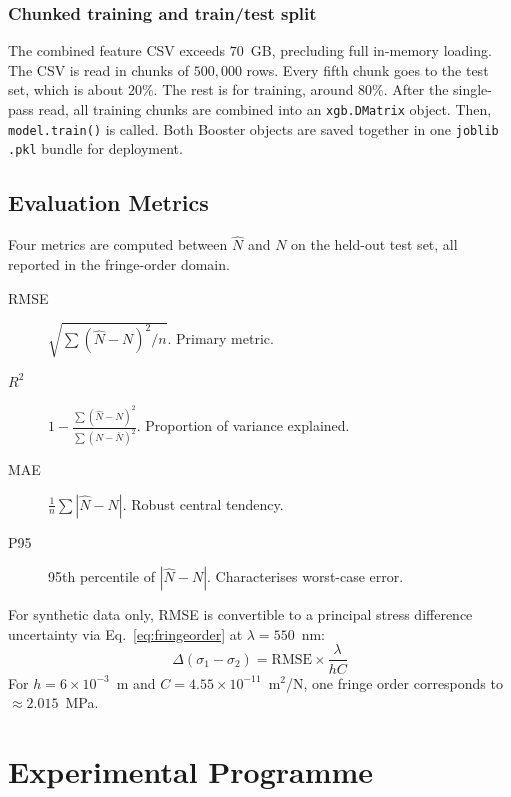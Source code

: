 \documentclass[review,12pt]{elsarticle}
\begin{document}
\subsubsection{Chunked training and train/test split}

The combined feature CSV exceeds $70$~GB, precluding full in-memory loading. The CSV is read in chunks of $500{,}000$ rows. Every fifth chunk goes to the test set, which is about $20\%$. The rest is for training, around $80\%$. After the single-pass read, all training chunks are combined into an \texttt{xgb.DMatrix} object. Then, \texttt{model.train()} is called. Both Booster objects are saved together in one \texttt{joblib} \texttt{.pkl} bundle for deployment.

\subsection{Evaluation Metrics}
\label{sec:metrics}

Four metrics are computed between $\hat{N}$ and $N$ on the held-out test
set, all reported in the fringe-order domain.

\begin{description}
  \item[RMSE] $\sqrt{\sum(\hat{N}-N)^2 / n}$. Primary metric.
  \item[$R^2$] $1 - \frac{\sum(\hat{N}-N)^2}{\sum(N-\bar{N})^2}$.
    Proportion of variance explained.
  \item[MAE] $\frac{1}{n}\sum|\hat{N}-N|$. Robust central tendency.
  \item[P95] 95th percentile of $|\hat{N}-N|$. Characterises worst-case
    error.
\end{description}

For synthetic data only, RMSE is convertible to a principal stress
difference uncertainty via Eq.~\eqref{eq:fringeorder} at
$\lambda = 550$~nm:
\begin{equation}
  \Delta(\sigma_1-\sigma_2) = \mathrm{RMSE} \times \frac{\lambda}{hC}
  \label{eq:stress_uncertainty}
\end{equation}
For $h = 6\times10^{-3}$~m and $C = 4.55\times10^{-11}$~m$^2$/N, one
fringe order corresponds to $\approx 2.015$~MPa.

\FloatBarrier
\section{Experimental Programme}
\label{sec:experiment}
\end{document}
